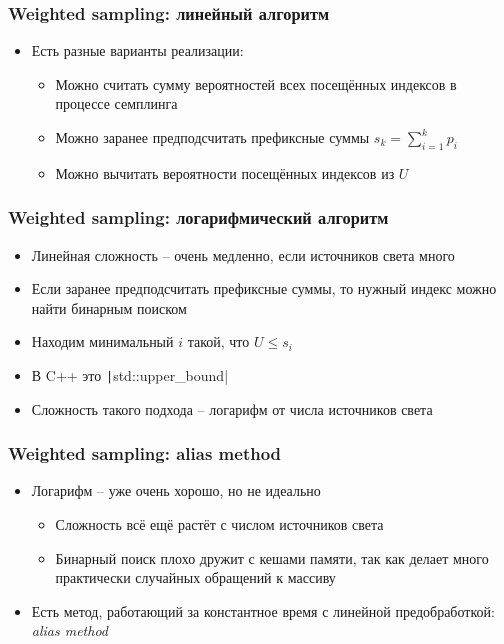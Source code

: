 \documentclass[10pt]{beamer}
\begin{document}
\begin{frame}
\frametitle{Weighted sampling: линейный алгоритм}
\begin{itemize}
\item Есть разные варианты реализации:
\pause
\begin{itemize}
\item Можно считать сумму вероятностей всех посещённых индексов в процессе семплинга
\pause
\item Можно заранее предподсчитать префиксные суммы \begin{math}s_k = \sum\limits_{i=1}^k p_i\end{math}
\pause
\item Можно вычитать вероятности посещённых индексов из \begin{math}U\end{math}
\end{itemize}
\end{itemize}
\end{frame}

\begin{frame}
\frametitle{Weighted sampling: логарифмический алгоритм}
\begin{itemize}
\item Линейная сложность -- очень медленно, если источников света много
\pause
\item Если заранее предподсчитать префиксные суммы, то нужный индекс можно найти бинарным поиском
\pause
\item Находим минимальный \begin{math}i\end{math} такой, что \begin{math}U \leq s_i\end{math}
\pause
\item В C++ это \texttt|std::upper_bound|
\pause
\item Сложность такого подхода -- логарифм от числа источников света
\end{itemize}
\end{frame}

\begin{frame}
\frametitle{Weighted sampling: alias method}
\begin{itemize}
\item Логарифм -- уже очень хорошо, но не идеально
\pause
\begin{itemize}
\item Сложность всё ещё растёт с числом источников света
\pause
\item Бинарный поиск плохо дружит с кешами памяти, так как делает много практически случайных обращений к массиву
\end{itemize}
\pause
\item Есть метод, работающий за константное время с линейной предобработкой: \textit{alias method}
\end{itemize}
\end{frame}
\end{document}
